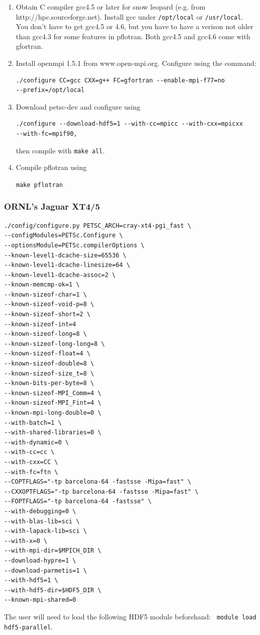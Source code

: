 \documentclass[12pt]{article}
\begin{document}
\begin{enumerate}
\item Obtain C compiler gcc4.5 or later for snow leopard (e.g. from http://hpc.sourceforge.net). 
Install gcc under \verb|/opt/local| or \verb|/usr/local|. 
You don't have to get gcc4.5 or 4.6,
but you have to have a verison not older than gcc4.3 for some features in
pflotran. Both gcc4.5 and gcc4.6 come with gfortran.

\item Install openmpi 1.5.1 from www.open-mpi.org. Configure using the command:

\begin{verbatim}
./configure CC=gcc CXX=g++ FC=gfortran --enable-mpi-f77=no 
--prefix=/opt/local
\end{verbatim}

\item Download petsc-dev and configure using

\begin{verbatim}
./configure --download-hdf5=1 --with-cc=mpicc --with-cxx=mpicxx 
--with-fc=mpif90,
\end{verbatim}

then compile with \verb|make all|.

\item Compile pflotran using

\verb|make pflotran|
\end{enumerate}

\subsubsection{ORNL's Jaguar XT4/5}

\footnotesize
\begin{verbatim}
./config/configure.py PETSC_ARCH=cray-xt4-pgi_fast \
--configModules=PETSc.Configure \
--optionsModule=PETSc.compilerOptions \
--known-level1-dcache-size=65536 \
--known-level1-dcache-linesize=64 \
--known-level1-dcache-assoc=2 \
--known-memcmp-ok=1 \
--known-sizeof-char=1 \
--known-sizeof-void-p=8 \
--known-sizeof-short=2 \
--known-sizeof-int=4
--known-sizeof-long=8 \
--known-sizeof-long-long=8 \
--known-sizeof-float=4 \
--known-sizeof-double=8 \
--known-sizeof-size_t=8 \
--known-bits-per-byte=8 \
--known-sizeof-MPI_Comm=4 \
--known-sizeof-MPI_Fint=4 \
--known-mpi-long-double=0 \
--with-batch=1 \
--with-shared-libraries=0 \
--with-dynamic=0 \
--with-cc=cc \
--with-cxx=CC \
--with-fc=ftn \
--COPTFLAGS="-tp barcelona-64 -fastsse -Mipa=fast" \
--CXXOPTFLAGS="-tp barcelona-64 -fastsse -Mipa=fast" \
--FOPTFLAGS="-tp barcelona-64 -fastsse" \
--with-debugging=0 \
--with-blas-lib=sci \
--with-lapack-lib=sci \
--with-x=0 \
--with-mpi-dir=$MPICH_DIR \
--download-hypre=1 \
--download-parmetis=1 \
--with-hdf5=1 \
--with-hdf5-dir=$HDF5_DIR \
--known-mpi-shared=0
\end{verbatim}
\normalsize
The user will need to load the following HDF5 module beforehand: \ \verb|module load hdf5-parallel|.
\end{document}
